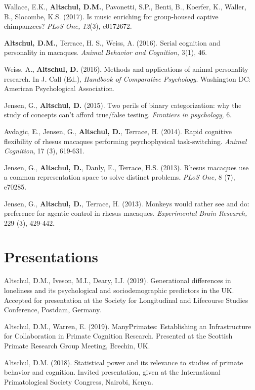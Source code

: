 \documentclass[margin,line]{res}
\begin{document}
\begin{resume}
Wallace, E.K., {\bf Altschul, D.M.}, Pavonetti, S.P., Benti, B., Koerfer, K., Waller, B., Slocombe, K.S. (2017). Is music enriching for group-housed captive chimpanzees?  {\it PLoS One, 12}(3), e0172672.

{\bf Altschul, D.M.}, Terrace, H. S., Weiss, A. (2016). Serial cognition and personality in macaques. {\it Animal Behavior and Cognition,} 3(1), 46.

Weiss, A., {\bf Altschul, D.} (2016). Methods and applications of animal personality research. In J. Call (Ed.), {\it Handbook of Comparative Psychology}. Washington DC: American Psychological Association.

Jensen, G., {\bf Altschul, D.} (2015). Two perils of binary categorization: why the study of concepts can't afford true/false testing. {\it Frontiers in psychology,} 6.

Avdagic, E., Jensen, G., {\bf Altschul, D.}, Terrace, H. (2014). Rapid cognitive flexibility of rhesus macaques performing psychophysical task-switching. {\it Animal Cognition}, 17 (3), 619-631.

Jensen, G., {\bf Altschul, D.}, Danly, E., Terrace, H.S. (2013). Rhesus macaques use a common representation space to solve distinct problems. {\it PLoS One,} 8 (7), e70285.

Jensen, G., {\bf Altschul, D.}, Terrace, H. (2013). Monkeys would rather see and do: preference for agentic control in rhesus macaques. {\it Experimental Brain Research,} 229 (3), 429-442.

\vspace{0.7cm}

\section{\sc Presentations} 

Altschul, D.M., Iveson, M.I., Deary, I.J. (2019). Generational differences in loneliness and its psychological and
sociodemographic predictors in the UK. Accepted for presentation at the Society for Longitudinal and Lifecourse Studies Conference, Postdam, Germany.

Altschul, D.M., Warren, E. (2019). ManyPrimates: Establishing an Infrastructure for Collaboration in Primate Cognition Research. Presented at the Scottish Primate Research Group Meeting, Brechin, UK.

Altschul, D.M. (2018). Statistical power and its relevance to studies of primate behavior and cognition. Invited presentation, given at the International Primatological Society Congress, Nairobi, Kenya.


\end{resume}
\end{document}
